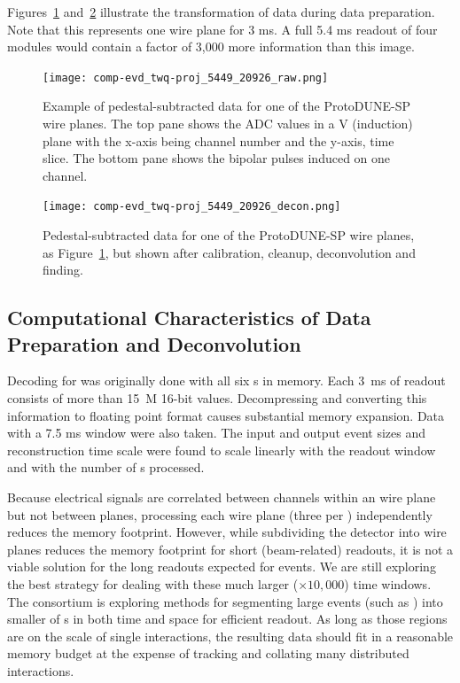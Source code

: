 Figures~\ref{fig:ch-exec-comp-chtraw} and~\ref{fig:ch-exec-comp-chtroi} illustrate the transformation of  data  during data preparation. Note that this represents one wire plane for 3 ms.  A full 5.4 ms readout of four \nominalmodsize modules would contain a factor of 3,000 more information than this image.

\begin{figure}[t]
\texttt{[image: comp-evd\_twq-proj\_5449\_20926\_raw.png]}
\caption[Example of pedestal-subtracted data for one of the ProtoDUNE-SP  wire planes]{Example of pedestal-subtracted data for one of the ProtoDUNE-SP  wire planes.  The top pane shows the ADC values in a V (induction) plane with the x-axis being channel number and the y-axis, time slice. The bottom pane shows the bipolar pulses induced on one channel. 
}
\label{fig:ch-exec-comp-chtraw}
\end{figure}


\begin{figure}[t]
 \texttt{[image: comp-evd\_twq-proj\_5449\_20926\_decon.png]}
\caption[Pedestal-subtracted data for one of the ProtoDUNE-SP  wire planes, additional processing]{
Pedestal-subtracted data for one of the ProtoDUNE-SP  wire planes, as Figure~\ref{fig:ch-exec-comp-chtraw}, but shown after calibration, cleanup, deconvolution and  finding. 
}
\label{fig:ch-exec-comp-chtroi}
\end{figure}


\subsection{Computational Characteristics of Data Preparation and Deconvolution }

Decoding for  was originally done with all six s in memory. Each \SI{3}{ms} of  readout consists of more than \SI{15}{M} 16-bit values. Decompressing and converting this information to floating point format causes substantial memory expansion. 
  Data with a 7.5 ms window were also taken. 
The input and output event sizes and reconstruction time scale were found to scale linearly with the readout window and with the number of s processed. 


Because electrical signals are correlated between channels within an  wire plane but not between planes, processing each wire plane (three per ) independently reduces the memory footprint.
However,  while subdividing the detector into wire planes reduces the memory footprint for short (beam-related) readouts, it is  not a viable solution for the long readouts expected for  events. We are still exploring the best strategy for dealing with these much larger ($\times 10,000$) time windows. 
The  consortium is exploring methods for segmenting large events (such as ) into  smaller of s in both time and space for efficient readout.  As long as those regions are on the scale of single interactions, the resulting data should fit in a reasonable memory budget at the expense of tracking and collating many distributed interactions. 

